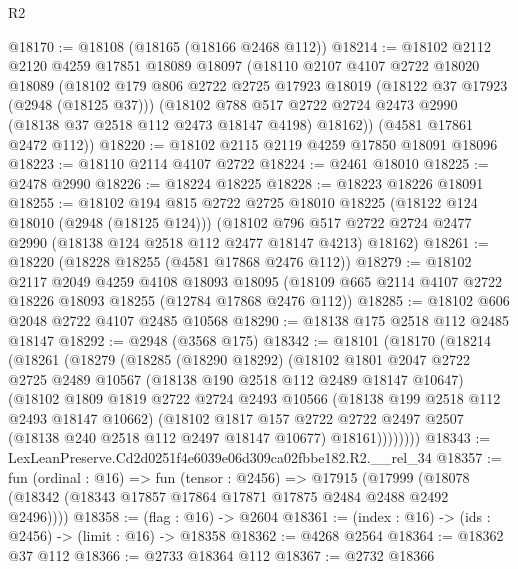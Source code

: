 \begin{lexlean}{R2}
\begin{coremodule}
@18170 := @18108 (@18165 (@18166 @2468 @112))
@18214 := @18102
    @2112
    @2120
    @4259
    @17851
    @18089
    @18097
    (@18110
      @2107
      @4107
      @2722
      @18020
      @18089
      (@18102
        @179
        @806
        @2722
        @2725
        @17923
        @18019
        (@18122 @37 @17923 (@2948 (@18125 @37)))
        (@18102
          @788
          @517
          @2722
          @2724
          @2473
          @2990
          (@18138 @37 @2518 @112 @2473 @18147 @4198)
          @18162))
      (@4581 @17861 @2472 @112))
@18220 := @18102 @2115 @2119 @4259 @17850 @18091 @18096
@18223 := @18110 @2114 @4107 @2722
@18224 := @2461 @18010
@18225 := @2478 @2990
@18226 := @18224 @18225
@18228 := @18223 @18226 @18091
@18255 := @18102
    @194
    @815
    @2722
    @2725
    @18010
    @18225
    (@18122 @124 @18010 (@2948 (@18125 @124)))
    (@18102 @796 @517 @2722 @2724 @2477 @2990 (@18138 @124 @2518 @112 @2477 @18147 @4213) @18162)
@18261 := @18220 (@18228 @18255 (@4581 @17868 @2476 @112))
@18279 := @18102
    @2117
    @2049
    @4259
    @4108
    @18093
    @18095
    (@18109 @665 @2114 @4107 @2722 @18226 @18093 @18255 (@12784 @17868 @2476 @112))
@18285 := @18102 @606 @2048 @2722 @4107 @2485 @10568
@18290 := @18138 @175 @2518 @112 @2485 @18147
@18292 := @2948 (@3568 @175)
@18342 := @18101
    (@18170
      (@18214
        (@18261
          (@18279
            (@18285
              (@18290 @18292)
              (@18102
                @1801
                @2047
                @2722
                @2725
                @2489
                @10567
                (@18138 @190 @2518 @112 @2489 @18147 @10647)
                (@18102
                  @1809
                  @1819
                  @2722
                  @2724
                  @2493
                  @10566
                  (@18138 @199 @2518 @112 @2493 @18147 @10662)
                  (@18102
                    @1817
                    @157
                    @2722
                    @2722
                    @2497
                    @2507
                    (@18138 @240 @2518 @112 @2497 @18147 @10677)
                    @18161))))))))
@18343 := LexLeanPreserve.Cd2d0251f4e6039e06d309ca02fbbe182.R2.__rel_34
@18357 := fun (ordinal : @16) =>
  fun (tensor : @2456) =>
  @17915 (@17999 (@18078 (@18342 (@18343 @17857 @17864 @17871 @17875 @2484 @2488 @2492 @2496))))
@18358 := (flag : @16) -> @2604
@18361 := (index : @16) -> (ids : @2456) -> (limit : @16) -> @18358
@18362 := @4268 @2564
@18364 := @18362 @37 @112
@18366 := @2733 @18364 @112
@18367 := @2732 @18366

\end{coremodule}
\end{lexlean}
